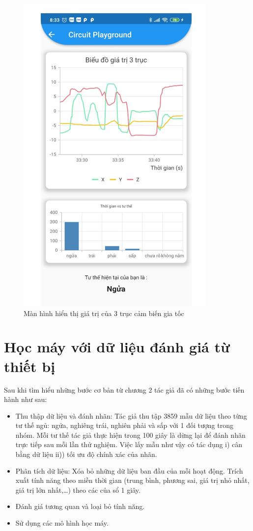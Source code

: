 \begin{figure}
    \centering
    \includegraphics[width=0.75\linewidth]{images/appbieudo.png}
    \caption{Màn hình hiển thị giá trị của 3 trục cảm biến gia tốc}
    \label{appbieudo}
\end{figure}

\section{Học máy với dữ liệu đánh giá từ thiết bị}
Sau khi tìm hiểu những bước cơ bản từ chương 2 tác giả đã có những bước tiến hành như sau:

\begin{itemize}
    \item Thu thập dữ liệu và đánh nhãn: Tác giả thu tập 3859 mẫu dữ liệu theo từng tư thế ngủ: ngửa, nghiêng trái, nghiên phải và sấp với 1 đối tượng trong nhóm. Mỗi tư thế tác giả thực hiện trong 100 giây là dừng lại để đánh nhãn trực tiếp sau mỗi lần thử nghiệm. Việc lấy mẫu như vậy có tác dụng i) cân bằng dữ liệu ii)) tối ưu độ chính xác của nhãn.
    
    \item Phân tích dữ liệu: Xóa bỏ những dữ liệu ban đầu của mỗi hoạt động. Trích xuất tính năng theo miền thời gian (trung bình, phương sai, giá trị nhỏ nhất, giá trị lớn nhất,…) theo các của sổ 1 giây.
    \item Đánh giá tương quan và loại bỏ tính năng.

    \item Sử dụng các mô hình học máy.
    
\end{itemize}




